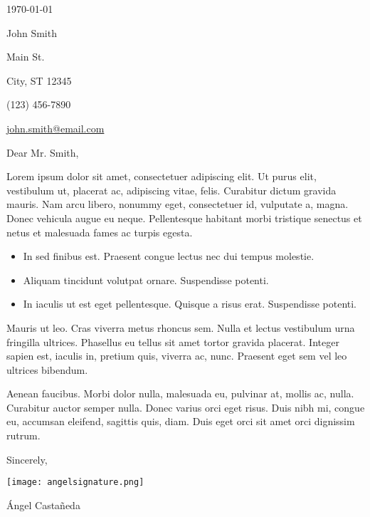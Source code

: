 \documentclass[12pt]{article}
\newcommand{\itemspace}{\vspace{0.5em}}
\begin{document}
\maketitle

\itemspace

\vspace{3em}

\noindent\monthdayyeardate\today

\vspace{3em}

\noindent John Smith

 Main St.

\noindent City, ST 12345

\noindent (123) 456-7890

\noindent \href{mailto:john.smith@email.com}{john.smith@email.com}

\vspace{3em}

\noindent Dear Mr. Smith,

\itemspace

Lorem ipsum dolor sit amet, consectetuer adipiscing elit.
Ut purus elit, vestibulum ut, placerat ac, adipiscing vitae, felis.
Curabitur dictum gravida mauris.
Nam arcu libero, nonummy eget, consectetuer id, vulputate a, magna.
Donec vehicula augue eu neque. Pellentesque habitant morbi tristique
senectus et netus et malesuada fames ac turpis egesta.

\itemspace

\begin{itemize}[nolistsep]
    \item In sed finibus est. Praesent congue lectus nec dui tempus molestie.

    \itemspace

    \item Aliquam tincidunt volutpat ornare. Suspendisse potenti.

    \itemspace

    \item In iaculis ut est eget pellentesque. Quisque a risus erat. Suspendisse potenti.
\end{itemize}

\itemspace

Mauris ut leo. Cras viverra metus rhoncus sem. Nulla et lectus vestibulum urna fringilla ultrices. Phasellus eu tellus sit amet tortor gravida placerat. Integer sapien est, iaculis in, pretium quis, viverra ac, nunc. Praesent eget sem vel leo ultrices bibendum.

\itemspace

Aenean faucibus. Morbi dolor nulla, malesuada eu, pulvinar at, mollis ac, nulla. Curabitur auctor semper nulla. Donec varius orci eget risus. Duis nibh mi, congue eu, accumsan eleifend, sagittis quis, diam. Duis eget orci sit amet orci dignissim rutrum.

\vspace{15mm}

\noindent Sincerely,

\noindent
\texttt{[image: angelsignature.png]}

\noindent Ángel Castañeda
\end{document}
